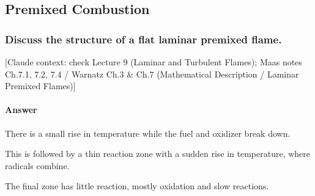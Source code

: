 \subsection{Premixed Combustion}

\subsubsection{Discuss the structure of a flat laminar premixed flame.}

{\color{gray}\footnotesize [Claude context: check Lecture 9 (Laminar and Turbulent Flames); Maas notes Ch.7.1, 7.2, 7.4 / Warnatz Ch.3 \& Ch.7 (Mathematical Description / Laminar Premixed Flames)]}

\paragraph{Answer}

There is a small rise in temperature while the fuel and oxidizer break down.

This is followed by a thin reaction zone with a sudden rise in temperature, where radicals combine.

The final zone has little reaction, mostly oxidation and slow reactions.

